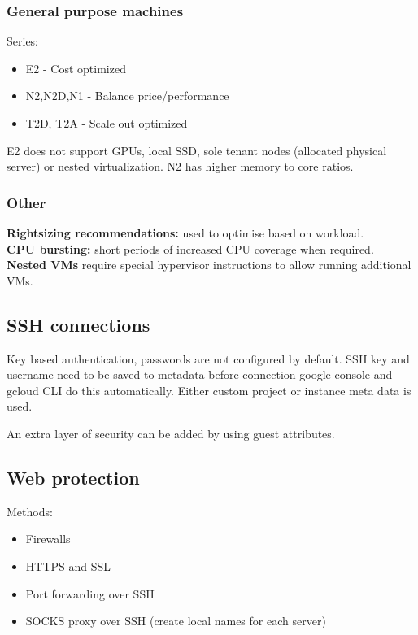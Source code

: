 \documentclass[11pt]{scrartcl} %
\begin{document}
\subsubsection{General purpose machines}

Series:
\begin{itemize}
	\item E2 - Cost optimized
	\item N2,N2D,N1 - Balance price/performance
	\item T2D, T2A - Scale out optimized
\end{itemize}

E2 does not support GPUs, local SSD, sole tenant nodes (allocated physical server) or nested virtualization.
N2 has higher memory to core ratios. 

\subsubsection{Other}

\textbf{Rightsizing recommendations:} used to optimise based on workload.\\
\textbf{CPU bursting:} short periods of increased CPU coverage when required.\\
\textbf{Nested VMs} require special hypervisor instructions to allow running additional VMs.

\subsection{SSH connections}

Key based authentication, passwords are not configured by default. SSH key and username need to be saved
to metadata before connection google console and gcloud CLI do this automatically. Either custom project
or instance meta data is used.

An extra layer of security can be added by using guest attributes.

\subsection{Web protection}

Methods:
\begin{itemize}
	\item Firewalls
	\item HTTPS and SSL
	\item Port forwarding over SSH 
	\item SOCKS proxy over SSH (create local names for each server)
\end{itemize}
\end{document}
